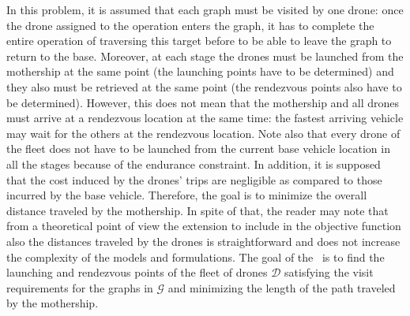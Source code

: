\noindent
In this problem, it is assumed that each graph must be visited by one drone: once the drone assigned to the operation enters the graph, it has to complete the entire operation of traversing this target before to be able to leave the graph to return to the base. Moreover, at each stage the drones must be launched from the mothership at the same point (the launching points have to be determined) and they also must be retrieved at the same point (the rendezvous points also have to be determined). However, this does not mean that the mothership and all drones must arrive at a rendezvous location at the same time: the fastest arriving vehicle may wait for the others at the rendezvous location. Note also that every drone of the fleet does not have to be launched from the current base vehicle location in all the stages because of the endurance constraint. In addition, it is supposed that the cost induced by the drones' trips are negligible as compared to those incurred by the base vehicle. Therefore, the goal is to minimize the overall distance traveled by the mothership. In spite of that, the reader may note that from a theoretical point of view the extension to include in the objective function also the distances traveled by the drones is straightforward and does not increase the complexity of the models and formulations.
\noindent
The goal of the \AMD \ is to find the launching and rendezvous points of the fleet of drones $\mathcal D$ satisfying the visit requirements for the graphs in $\mathcal G$ and minimizing the length of the path traveled by the mothership.\\

\noindent



